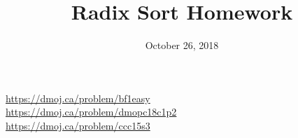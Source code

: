 \documentclass{problem-set}
\title{Radix Sort Homework}
\date{October 26, 2018}
\begin{document}
\maketitle
{
  \parbox{\textwidth}{
    \url{https://dmoj.ca/problem/bf1easy} \\
    \url{https://dmoj.ca/problem/dmopc18c1p2} \\
    \url{https://dmoj.ca/problem/ccc15s3}
  }
}\\
\vspace{3em}\\
\parbox{\textwidth}{
}
\end{document}

